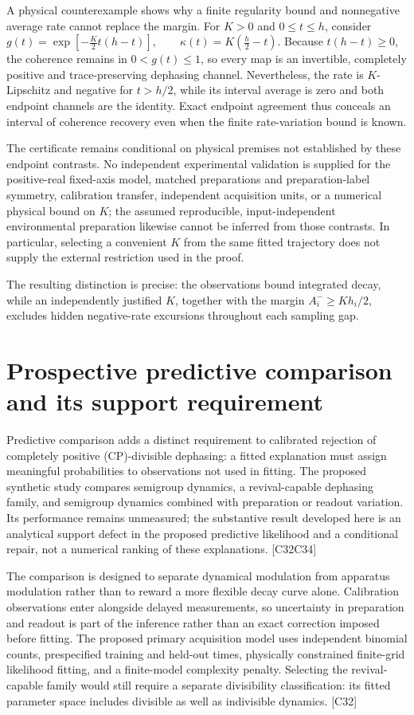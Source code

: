 \documentclass[11pt]{article}
\begin{document}
A physical counterexample shows why a finite regularity bound and nonnegative average rate cannot replace the margin. For $K>0$ and $0\leq t\leq h$, consider
$g(t)=\exp\!\left[-\frac{K}{2}t(h-t)\right],\qquad\kappa(t)=K\left(\frac h2-t\right).$
Because $t(h-t)\geq0$, the coherence remains in $0<g(t)\leq1$, so every map is an invertible, completely positive and trace-preserving dephasing channel. Nevertheless, the rate is $K$-Lipschitz and negative for $t>h/2$, while its interval average is zero and both endpoint channels are the identity. Exact endpoint agreement thus conceals an interval of coherence recovery even when the finite rate-variation bound is known.

The certificate remains conditional on physical premises not established by these endpoint contrasts. No independent experimental validation is supplied for the positive-real fixed-axis model, matched preparations and preparation-label symmetry, calibration transfer, independent acquisition units, or a numerical physical bound on $K$; the assumed reproducible, input-independent environmental preparation likewise cannot be inferred from those contrasts. In particular, selecting a convenient $K$ from the same fitted trajectory does not supply the external restriction used in the proof.

The resulting distinction is precise: the observations bound integrated decay, while an independently justified $K$, together with the margin $A_i^-\geq Kh_i/2$, excludes hidden negative-rate excursions throughout each sampling gap.

\section{Prospective predictive comparison and its support requirement}
Predictive comparison adds a distinct requirement to calibrated rejection of completely positive (CP)-divisible dephasing: a fitted explanation must assign meaningful probabilities to observations not used in fitting. The proposed synthetic study compares semigroup dynamics, a revival-capable dephasing family, and semigroup dynamics combined with preparation or readout variation. Its performance remains unmeasured; the substantive result developed here is an analytical support defect in the proposed predictive likelihood and a conditional repair, not a numerical ranking of these explanations. [C32\textendash{}C34]

The comparison is designed to separate dynamical modulation from apparatus modulation rather than to reward a more flexible decay curve alone. Calibration observations enter alongside delayed measurements, so uncertainty in preparation and readout is part of the inference rather than an exact correction imposed before fitting. The proposed primary acquisition model uses independent binomial counts, prespecified training and held-out times, physically constrained finite-grid likelihood fitting, and a finite-model complexity penalty. Selecting the revival-capable family would still require a separate divisibility classification: its fitted parameter space includes divisible as well as indivisible dynamics. [C32]
\end{document}
